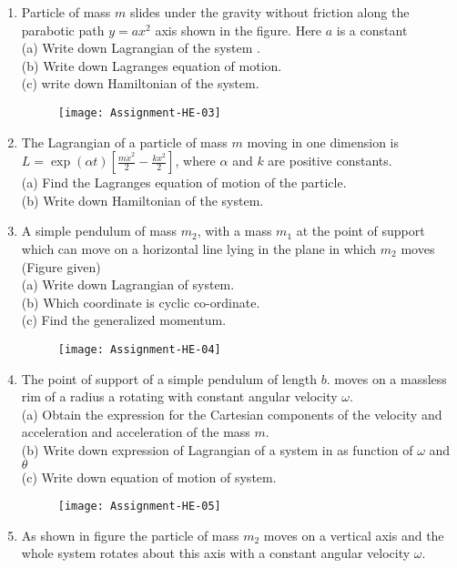 \begin{enumerate}
	 \item Particle of mass $m$ slides under the gravity without friction along the parabotic path
	 $y=a x^{2}$ axis shown in the figure. Here $a$ is a constant\\
	 (a) Write down Lagrangian of the system .\\
	 (b) Write down Lagranges equation of motion.\\
	 (c) write down Hamiltonian of the system.
	  \begin{figure}[H]
	 	\centering
	 	\texttt{[image: Assignment-HE-03]}
	 \end{figure}
	 \item The Lagrangian of a particle of mass $m$ moving in one dimension is $L=\exp (\alpha t)\left[\frac{m \dot{x}^{2}}{2}-\frac{k x^{2}}{2}\right]$, where $\alpha$ and $k$ are positive constants.\\
	 (a) Find the Lagranges equation of motion of the particle.\\
	 (b) Write down Hamiltonian of the system.
	 \item A simple pendulum of mass $m_{2}$, with a mass $m_{1}$ at the point of support which can move on a horizontal line lying in the plane in which $m_{2}$ moves (Figure given)\\
	 (a) Write down Lagrangian of system.\\
	 (b) Which coordinate is cyclic co-ordinate.\\
	 (c) Find the generalized momentum.
	  \begin{figure}[H]
	 	\centering
	 	\texttt{[image: Assignment-HE-04]}
	 \end{figure}
	 \item The point of support of a simple pendulum of length $b$. moves on a massless rim of a radius a rotating with constant angular velocity $\omega$.\\
	 (a) Obtain the expression for the Cartesian components of the velocity and acceleration and acceleration of the mass $m$.\\
	 (b) Write down expression of Lagrangian of a system in as function of $\omega$ and $\theta$\\
	 (c) Write down equation of motion of system.
	  \begin{figure}[H]
	 	\centering
	 	\texttt{[image: Assignment-HE-05]}
	 \end{figure}
	 \item As shown in figure the particle of mass $m_{2}$ moves on a vertical axis and the whole system rotates about this axis with a constant angular velocity $\omega$.

\end{enumerate}
